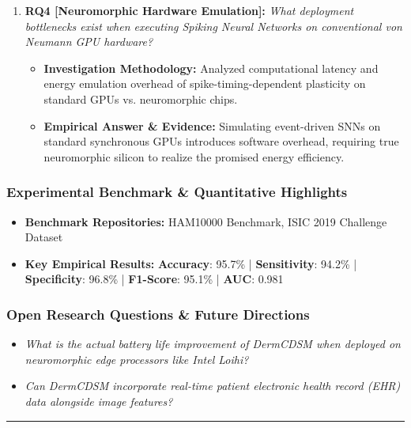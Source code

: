 \begin{enumerate}[label=\textbf{\arabic*.}, leftmargin=*]
\begin{itemize}[leftmargin=1.5em]
  \end{itemize}
  \item \textbf{RQ4 [Neuromorphic Hardware Emulation]:} \textit{What deployment bottlenecks exist when executing Spiking Neural Networks on conventional von Neumann GPU hardware?}
  \begin{itemize}[leftmargin=1.5em]
    \item \textbf{Investigation Methodology:} Analyzed computational latency and energy emulation overhead of spike-timing-dependent plasticity on standard GPUs vs. neuromorphic chips.
    \item \textbf{Empirical Answer \& Evidence:} Simulating event-driven SNNs on standard synchronous GPUs introduces software overhead, requiring true neuromorphic silicon to realize the promised energy efficiency.
  \end{itemize}
\end{enumerate}

\subsubsection*{Experimental Benchmark \& Quantitative Highlights}
\begin{itemize}[leftmargin=*]
  \item \textbf{Benchmark Repositories:} HAM10000 Benchmark, ISIC 2019 Challenge Dataset
  \item \textbf{Key Empirical Results:} \textbf{Accuracy}: 95.7\% \quad | \quad \textbf{Sensitivity}: 94.2\% \quad | \quad \textbf{Specificity}: 96.8\% \quad | \quad \textbf{F1-Score}: 95.1\% \quad | \quad \textbf{AUC}: 0.981
\end{itemize}

\subsubsection*{Open Research Questions \& Future Directions}
\begin{itemize}[leftmargin=*]
  \item \textit{What is the actual battery life improvement of DermCDSM when deployed on neuromorphic edge processors like Intel Loihi?}
  \item \textit{Can DermCDSM incorporate real-time patient electronic health record (EHR) data alongside image features?}
\end{itemize}
\vspace{0.8em}\hrule\vspace{1.2em}
